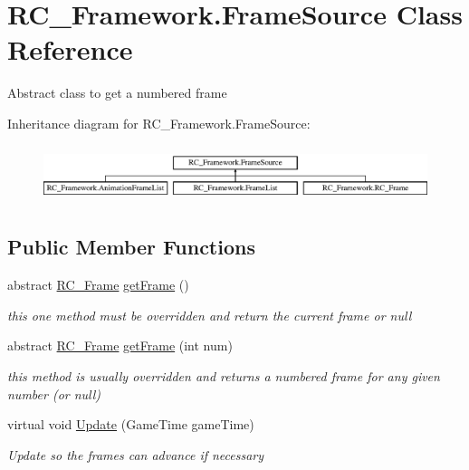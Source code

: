 \hypertarget{class_r_c___framework_1_1_frame_source}{}\section{R\+C\+\_\+\+Framework.\+Frame\+Source Class Reference}
\label{class_r_c___framework_1_1_frame_source}


Abstract class to get a numbered frame  


Inheritance diagram for R\+C\+\_\+\+Framework.\+Frame\+Source\+:\begin{figure}[H]
\begin{center}
\leavevmode
\includegraphics[height=1.689291cm]{class_r_c___framework_1_1_frame_source}
\end{center}
\end{figure}
\subsection*{Public Member Functions}
\begin{DoxyCompactItemize}
\item 
abstract \mbox{\hyperlink{class_r_c___framework_1_1_r_c___frame}{R\+C\+\_\+\+Frame}} \mbox{\hyperlink{class_r_c___framework_1_1_frame_source_a6fd84a8d608da7d9ff2ff5ab10ed4243}{get\+Frame}} ()
\begin{DoxyCompactList}\small\item\em this one method must be overridden and return the current frame or null \end{DoxyCompactList}\item 
abstract \mbox{\hyperlink{class_r_c___framework_1_1_r_c___frame}{R\+C\+\_\+\+Frame}} \mbox{\hyperlink{class_r_c___framework_1_1_frame_source_a562dc295b5c265ec760227978802eb3a}{get\+Frame}} (int num)
\begin{DoxyCompactList}\small\item\em this method is usually overridden and returns a numbered frame for any given number (or null) \end{DoxyCompactList}\item 
virtual void \mbox{\hyperlink{class_r_c___framework_1_1_frame_source_a4ab94513c0555c16316b540aed1e9144}{Update}} (Game\+Time game\+Time)
\begin{DoxyCompactList}\small\item\em Update so the frames can advance if necessary \end{DoxyCompactList}\end{DoxyCompactItemize}


